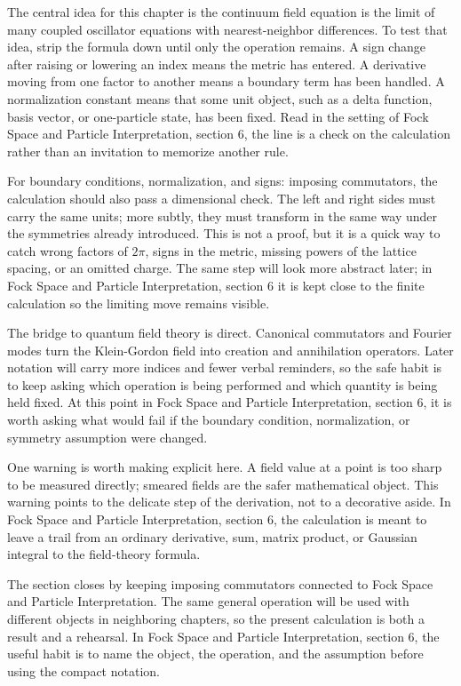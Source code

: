 The central idea for this chapter is the continuum field equation is the limit of many coupled oscillator equations with nearest-neighbor differences.  To test that idea, strip the formula down until only the operation remains.  A sign change after raising or lowering an index means the metric has entered.  A derivative moving from one factor to another means a boundary term has been handled.  A normalization constant means that some unit object, such as a delta function, basis vector, or one-particle state, has been fixed.  Read in the setting of Fock Space and Particle Interpretation, section 6, the line is a check on the calculation rather than an invitation to memorize another rule.

For boundary conditions, normalization, and signs: imposing commutators, the calculation should also pass a dimensional check.  The left and right sides must carry the same units; more subtly, they must transform in the same way under the symmetries already introduced.  This is not a proof, but it is a quick way to catch wrong factors of \(2\pi\), signs in the metric, missing powers of the lattice spacing, or an omitted charge.  The same step will look more abstract later; in Fock Space and Particle Interpretation, section 6 it is kept close to the finite calculation so the limiting move remains visible.

The bridge to quantum field theory is direct.  Canonical commutators and Fourier modes turn the Klein-Gordon field into creation and annihilation operators.  Later notation will carry more indices and fewer verbal reminders, so the safe habit is to keep asking which operation is being performed and which quantity is being held fixed.  At this point in Fock Space and Particle Interpretation, section 6, it is worth asking what would fail if the boundary condition, normalization, or symmetry assumption were changed.

One warning is worth making explicit here.  A field value at a point is too sharp to be measured directly; smeared fields are the safer mathematical object.  This warning points to the delicate step of the derivation, not to a decorative aside.  In Fock Space and Particle Interpretation, section 6, the calculation is meant to leave a trail from an ordinary derivative, sum, matrix product, or Gaussian integral to the field-theory formula.

The section closes by keeping imposing commutators connected to Fock Space and Particle Interpretation.  The same general operation will be used with different objects in neighboring chapters, so the present calculation is both a result and a rehearsal.  In Fock Space and Particle Interpretation, section 6, the useful habit is to name the object, the operation, and the assumption before using the compact notation.



